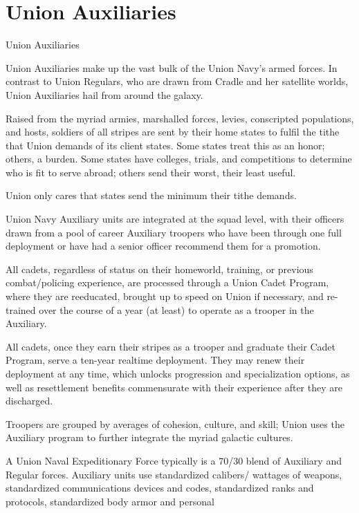  
\section{Union Auxiliaries}
Union Auxiliaries  

Union Auxiliaries make up the vast bulk of the Union Navy’s armed forces. In contrast to Union  
Regulars, who are drawn from Cradle and her satellite worlds, Union Auxiliaries hail from around  
the galaxy.  
 

Raised from the myriad armies, marshalled forces, levies, conscripted populations, and hosts,  
soldiers of all stripes are sent by their home states to fulfil the tithe that Union demands of its  
client states. Some states treat this as an honor; others, a burden. Some states have colleges,  
trials, and competitions to determine who is fit to serve abroad; others send their worst, their  
least useful. 
 

Union only cares that states send the minimum their tithe demands. 
 

Union Navy Auxiliary units are integrated at the squad level, with their officers drawn from a pool  
of career Auxiliary troopers who have been through one full deployment or have had a senior  
officer recommend them for a promotion. 
 

All cadets, regardless of status on their homeworld, training, or previous combat/policing  
experience, are processed through a Union Cadet Program, where they are reeducated, brought  
up to speed on Union if necessary, and re-trained over the course of a year (at least) to operate  
as a trooper in the Auxiliary.
 

All cadets, once they earn their stripes as a trooper and graduate their Cadet Program, serve a  
ten-year realtime deployment. They may renew their deployment at any time, which unlocks  
progression and specialization options, as well as resettlement benefits commensurate with their  
experience after they are discharged. 
 

Troopers are grouped by averages of cohesion, culture, and skill; Union uses the Auxiliary  
program to further integrate the myriad galactic cultures. 
 

A Union Naval Expeditionary Force typically is a 70/30 blend of Auxiliary and Regular forces.  
Auxiliary units use standardized calibers/ wattages of weapons, standardized communications  
devices and codes, standardized ranks and protocols, standardized body armor and personal  

                                                                                                                    


